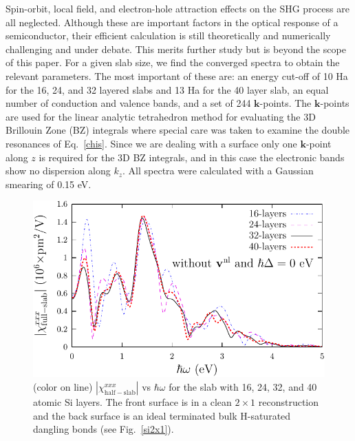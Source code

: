 \documentclass[floatfix,prb,aps,superscriptaddress,showpacs,11pt,preprint,letterpaper]{revtex4}
\def\chon{red}
\begin{document}
Spin-orbit, local field, and electron-hole 
attraction\cite{beyond}
effects on the SHG process are all neglected.
Although these are important factors in the optical response of a semiconductor,
their efficient calculation is still theoretically and  
numerically challenging and  
under debate. This merits further study but is beyond the scope of this paper.
For a given slab size, we find the converged spectra 
to obtain the relevant parameters. The most important of 
these are: an energy cut-off of 10 Ha for the 16, 24, and 32 layered
slabs
and 13 Ha for the 40 layer slab,
an equal number of conduction and 
valence bands, and a set of 244 $\mathbf{k}$-points.
The $\mathbf{k}$-points are used for 
the linear analytic  
tetrahedron method for evaluating the  
{\color{\chon}3D} Brillouin Zone (BZ) integrals  
where special care was taken to examine the double resonances
of Eq.~\eqref{chis}. \cite{nastosPRB05}
{\color{\chon}Since we are dealing with a surface
only one $\mathbf{k}$-point
along $z$ is required for the 3D BZ integrals, and in this case
the electronic bands 
show no dispersion along $k_z$. 
}
All spectra were calculated with a Gaussian smearing of 0.15 eV.
\begin{figure}
\centering 
\includegraphics[scale=.8]{fig3}
\caption{(color on line) 
$|\chi_{\mathrm{half-slab}}^{xxx}|$ vs $\hbar\omega$ 
for the slab
with 16, 24, 32, and 40 atomic Si layers. The front surface 
is in a clean $2\times 1$ reconstruction and the back 
surface is an ideal terminated bulk H-saturated dangling bonds (see Fig.~\ref{si2x1}).
\label{fig1}} 
\end{figure}
\end{document}
